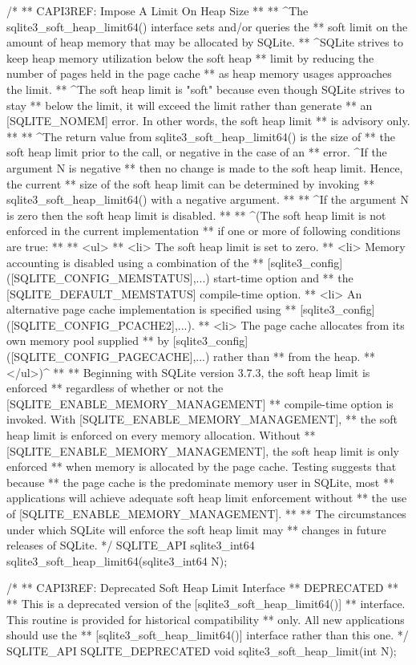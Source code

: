 \begin{Codex}[label=sqlite3.h,numbers=left]
{/*
** CAPI3REF: Impose A Limit On Heap Size
**
** ^The sqlite3_soft_heap_limit64() interface sets and/or queries the
** soft limit on the amount of heap memory that may be allocated by SQLite.
** ^SQLite strives to keep heap memory utilization below the soft heap
** limit by reducing the number of pages held in the page cache
** as heap memory usages approaches the limit.
** ^The soft heap limit is "soft" because even though SQLite strives to stay
** below the limit, it will exceed the limit rather than generate
** an [SQLITE_NOMEM] error.  In other words, the soft heap limit 
** is advisory only.
**
** ^The return value from sqlite3_soft_heap_limit64() is the size of
** the soft heap limit prior to the call, or negative in the case of an
** error.  ^If the argument N is negative
** then no change is made to the soft heap limit.  Hence, the current
** size of the soft heap limit can be determined by invoking
** sqlite3_soft_heap_limit64() with a negative argument.
**
** ^If the argument N is zero then the soft heap limit is disabled.
**
** ^(The soft heap limit is not enforced in the current implementation
** if one or more of following conditions are true:
**
** <ul>
** <li> The soft heap limit is set to zero.
** <li> Memory accounting is disabled using a combination of the
**      [sqlite3_config]([SQLITE_CONFIG_MEMSTATUS],...) start-time option and
**      the [SQLITE_DEFAULT_MEMSTATUS] compile-time option.
** <li> An alternative page cache implementation is specified using
**      [sqlite3_config]([SQLITE_CONFIG_PCACHE2],...).
** <li> The page cache allocates from its own memory pool supplied
**      by [sqlite3_config]([SQLITE_CONFIG_PAGECACHE],...) rather than
**      from the heap.
** </ul>)^
**
** Beginning with SQLite version 3.7.3, the soft heap limit is enforced
** regardless of whether or not the [SQLITE_ENABLE_MEMORY_MANAGEMENT]
** compile-time option is invoked.  With [SQLITE_ENABLE_MEMORY_MANAGEMENT],
** the soft heap limit is enforced on every memory allocation.  Without
** [SQLITE_ENABLE_MEMORY_MANAGEMENT], the soft heap limit is only enforced
** when memory is allocated by the page cache.  Testing suggests that because
** the page cache is the predominate memory user in SQLite, most
** applications will achieve adequate soft heap limit enforcement without
** the use of [SQLITE_ENABLE_MEMORY_MANAGEMENT].
**
** The circumstances under which SQLite will enforce the soft heap limit may
** changes in future releases of SQLite.
*/
SQLITE_API sqlite3_int64 sqlite3_soft_heap_limit64(sqlite3_int64 N);

/*
** CAPI3REF: Deprecated Soft Heap Limit Interface
** DEPRECATED
**
** This is a deprecated version of the [sqlite3_soft_heap_limit64()]
** interface.  This routine is provided for historical compatibility
** only.  All new applications should use the
** [sqlite3_soft_heap_limit64()] interface rather than this one.
*/
SQLITE_API SQLITE_DEPRECATED void sqlite3_soft_heap_limit(int N);


}
\end{Codex}
